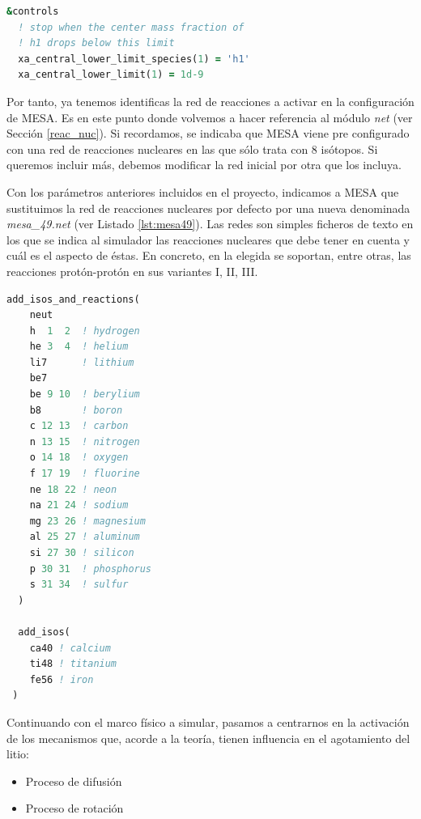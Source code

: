\begin{lstlisting}[language=Fortran, float, caption={Parametrización de la condición de parada de la simulación cuando se produce el agotamiento de H en el núcleo de la estrella}, label={lst:stop_params}]
&controls
  ! stop when the center mass fraction of 
  ! h1 drops below this limit
  xa_central_lower_limit_species(1) = 'h1'
  xa_central_lower_limit(1) = 1d-9
\end{lstlisting}


Por tanto, ya tenemos identificas la red de reacciones a activar en la configuración de MESA. Es en este punto donde volvemos a hacer referencia al módulo \textit{net} (ver Sección  \ref{reac_nuc}). Si recordamos, se indicaba que MESA viene pre configurado con una red de reacciones nucleares en las que sólo trata con 8 isótopos. Si queremos incluir más, debemos modificar la red inicial por otra que los incluya.\par

Con los parámetros anteriores incluidos en el proyecto, indicamos a MESA que sustituimos la red de reacciones nucleares por defecto por una nueva denominada \textit{mesa\_49.net} (ver Listado \ref{lst:mesa49}). Las redes son simples ficheros de texto en los que se indica al simulador las reacciones nucleares que debe tener en cuenta y cuál es el aspecto de éstas. En concreto, en la elegida se soportan, entre otras, las reacciones protón-protón en sus variantes I, II, III.\par

\begin{lstlisting}[language=Fortran, float, caption={Red de reacciones mesa\_49.net. Esta red incluye un tratamiento detallado de la para los elementos ligeros H, He, Li y Be}, label={lst:mesa49}]
  add_isos_and_reactions(
    neut
    h  1  2  ! hydrogen
    he 3  4  ! helium
    li7      ! lithium
    be7
    be 9 10  ! berylium
    b8       ! boron
    c 12 13  ! carbon
    n 13 15  ! nitrogen
    o 14 18  ! oxygen
    f 17 19  ! fluorine
    ne 18 22 ! neon
    na 21 24 ! sodium
    mg 23 26 ! magnesium
    al 25 27 ! aluminum
    si 27 30 ! silicon
    p 30 31  ! phosphorus
    s 31 34  ! sulfur
  )

  add_isos(
    ca40 ! calcium
    ti48 ! titanium
    fe56 ! iron
 )
\end{lstlisting}


Continuando con el marco físico a simular, pasamos a centrarnos en la activación de los mecanismos que, acorde a la teoría, tienen influencia en el agotamiento del litio:
\begin{itemize}
    \item Proceso de difusión
    \item Proceso de rotación
\end{itemize}

